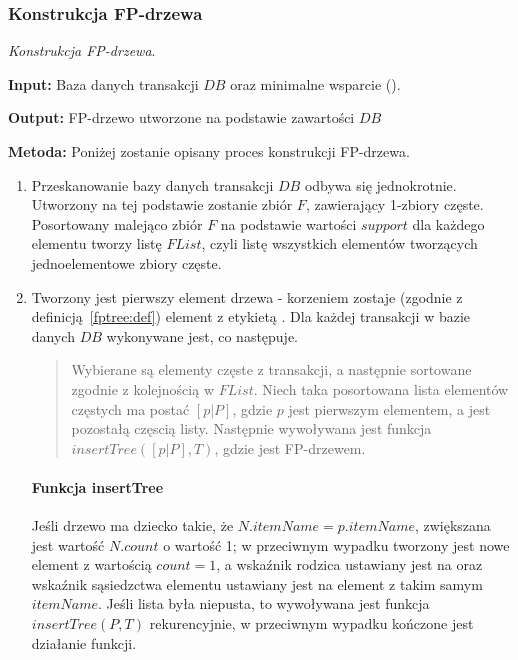 \subsubsection{Konstrukcja FP-drzewa}\label{fptree:construction}
\begin{alg}\label{alg:fptre:econstruction}
	\emph{Konstrukcja FP-drzewa}.

	\textbf{Input:} Baza danych transakcji $DB$ oraz minimalne wsparcie ().

	\textbf{Output:} FP-drzewo utworzone na podstawie zawartości $DB$

	\textbf{Metoda:} Poniżej zostanie opisany proces konstrukcji FP-drzewa.

	\begin{enumerate}
		\item Przeskanowanie bazy danych transakcji $DB$ odbywa się jednokrotnie. Utworzony na tej podstawie zostanie zbiór $F$, zawierający 1-zbiory częste. Posortowany malejąco zbiór $F$ na podstawie wartości $support$ dla każdego elementu tworzy listę $FList$, czyli listę wszystkich elementów tworzących jednoelementowe zbiory częste.
		\item Tworzony jest pierwszy element drzewa - korzeniem zostaje (zgodnie z definicją~\ref{fptree:def}) element z etykietą . Dla każdej transakcji w bazie danych $DB$ wykonywane jest, co następuje.
		\begin{quote}
			Wybierane są elementy częste z transakcji, a następnie sortowane zgodnie z kolejnością w $FList$. Niech taka posortowana lista elementów częstych ma postać $[p|P]$, gdzie $p$ jest pierwszym elementem, a  jest pozostałą częscią listy. Następnie wywoływana jest funkcja $insertTree([p|P], T)$, gdzie  jest FP-drzewem.
		\end{quote}
			\paragraph{Funkcja insertTree} Jeśli drzewo  ma dziecko  takie, że $N.itemName = p.itemName$, zwiększana jest wartość $N.count$ o wartość 1; w przeciwnym wypadku tworzony jest nowe element  z wartością $count = 1$, a wskaźnik rodzica ustawiany jest na  oraz wskaźnik sąsiedzctwa elementu ustawiany jest na element z takim samym $itemName$. Jeśli lista  była niepusta, to wywoływana jest funkcja $insertTree(P, T)$ rekurencyjnie, w przeciwnym wypadku kończone jest działanie funkcji.
	\end{enumerate}
\end{alg}

